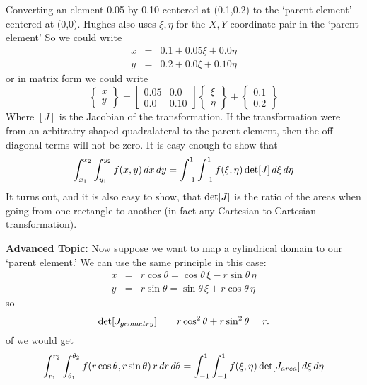 \documentclass{article}
\begin{document}
Converting an element 0.05 by 0.10 centered at (0.1,0.2) to the `parent element'
centered at (0,0).     Hughes also uses $\xi, \eta$ for the $X,Y$ coordinate
pair in the `parent element'   So we could write
\begin{eqnarray}
x & = & 0.1 + {0.05} \xi + 0.0 \eta\\
y & = & 0.2 + {0.0} \xi + {0.10} \eta 
\end{eqnarray}
or in matrix form we could write
\begin{equation} 
\left \{ \begin{array}{c} x \\ y \end{array} \right \}  = 
\left [ \begin{array}{cc} 
0.05 & 0.0 \\  
0.0 & 0.10
\end{array} \right ] \left \{ \begin{array}{c}\xi \\ \eta \end{array} \right \}
+  \left \{ \begin{array}{c} 0.1 \\ 0.2 \end{array} \right \} 
\end{equation}
Where $[J]$ is the Jacobian of the transformation.  If the transformation were
from an arbitratry shaped quadralateral to the parent element, then the off
diagonal terms will not be zero.   It is easy enough to show that
\begin{equation}
\int _{x_1} ^{x_2} \int _{y_1} ^{y_2}  f(x,y) \, dx\, dy = 
\int _{-1} ^1 \int _{-1} ^1 f( \xi , \eta ) \, {\rm det} [J] \, d\xi \, d\eta
\end{equation}
It turns out, and it is also easy to show, that ${\rm det} [J]$ is the ratio of
the areas when going from one rectangle to another (in fact any Cartesian to
Cartesian transformation).

{\bf Advanced Topic:}  Now suppose we want to map a cylindrical domain to our
`parent element.'  We can use the same principle in this case:
\begin{eqnarray} 
x &=& r \cos \theta = \cos \theta \, \xi - r \sin \theta \, \eta \\ 
y &=& r \sin \theta = \sin \theta \, \xi + r \cos \theta \, \eta 
\end{eqnarray}
so
\begin{equation}
{\rm det} [J_{geometry}] ~=~ r \cos^2 \theta  + r \sin^2 \theta = r.
\end{equation}
of we would get
\begin{equation}
\int _{r_1} ^{r_2} \int _{\theta_1} ^{\theta_2}  f(r\cos\theta, r\sin\theta) \,
r \, dr\, d\theta = 
\int _{-1} ^1 \int _{-1} ^1 f( \xi , \eta ) \, {\rm det} [J_{area}] \, d\xi \,
d\eta
\end{equation}
\end{document}
